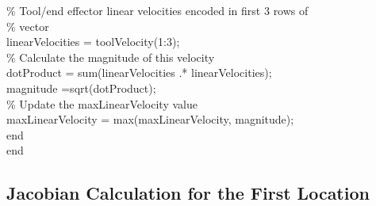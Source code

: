 \begin{algorithm}[H]
    \hspace{18pt}    \hspace{18pt}\% Tool/end effector linear velocities encoded in first 3 rows of\\
    \hspace{18pt}    \hspace{18pt}\% vector\\
    \hspace{18pt}    \hspace{18pt}linearVelocities = toolVelocity(1:3);\\
    \hspace{18pt}    \hspace{18pt}\% Calculate the magnitude of this velocity\\
    \hspace{18pt}    \hspace{18pt}dotProduct = sum(linearVelocities .* linearVelocities);\\
    \hspace{18pt}    \hspace{18pt}magnitude =sqrt(dotProduct);\\
    \hspace{18pt}    \hspace{18pt}\% Update the maxLinearVelocity value\\
    \hspace{18pt}    \hspace{18pt}maxLinearVelocity = max(maxLinearVelocity, magnitude);\\
    \hspace{18pt}end\\
    end\\
\end{algorithm}
\subsection{Jacobian Calculation for the First Location}

